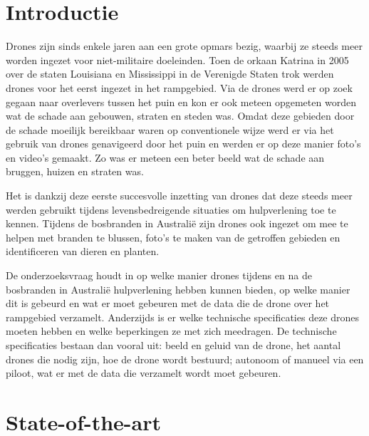
\section{Introductie} %
\label{sec:introductie}

Drones zijn sinds enkele jaren aan een grote opmars bezig, waarbij ze steeds meer worden ingezet voor niet-militaire doeleinden. Toen de orkaan Katrina in 2005 over de staten Louisiana en Mississippi in de Verenigde Staten trok werden drones voor het eerst ingezet in het rampgebied. \autocite{Murphy2015} Via de drones werd er op zoek gegaan naar overlevers tussen het puin en kon er ook meteen opgemeten worden wat de schade aan gebouwen, straten en steden was. Omdat deze gebieden door de schade moeilijk bereikbaar waren op conventionele wijze werd er via het gebruik van drones genavigeerd door het puin en werden er op deze manier foto's en video's gemaakt. Zo was er meteen een beter beeld wat de schade aan bruggen, huizen en straten was.

Het is dankzij deze eerste succesvolle inzetting van drones dat deze steeds meer werden gebruikt tijdens levensbedreigende situaties om hulpverlening toe te kennen. Tijdens de bosbranden in Australië zijn drones ook ingezet om mee te helpen met branden te blussen, foto's te maken van de getroffen gebieden en identificeren van dieren en planten.

De onderzoeksvraag houdt in op welke manier drones tijdens en na de bosbranden in Australië hulpverlening hebben kunnen bieden, op welke manier dit is gebeurd en wat er moet gebeuren met de data die de drone over het rampgebied verzamelt. Anderzijds is er welke technische specificaties deze drones moeten hebben en welke beperkingen ze met zich meedragen. De technische specificaties bestaan dan vooral uit: beeld en geluid van de drone, het aantal drones die nodig zijn, hoe de drone wordt bestuurd; autonoom of manueel via een piloot, wat er met de data die verzamelt wordt moet gebeuren.


\section{State-of-the-art}
\label{sec:state-of-the-art}


